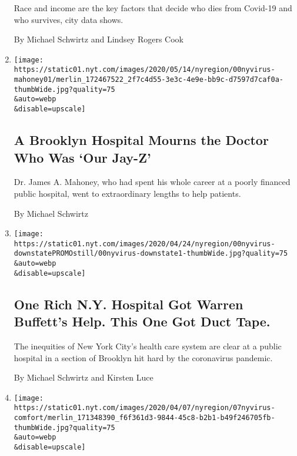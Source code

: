 \begin{enumerate}
  Race and income are the key factors that decide who dies from Covid-19
  and who survives, city data shows.

  By Michael Schwirtz and Lindsey Rogers Cook
\item
  \href{/2020/05/18/nyregion/doctor-dies-coronavirus-james-mahoney.html}{}

  \texttt{[image: https://static01.nyt.com/images/2020/05/14/nyregion/00nyvirus-mahoney01/merlin\_172467522\_2f7c4d55-3e3c-4e9e-bb9c-d7597d7caf0a-thumbWide.jpg?quality=75\\\&auto=webp\\\&disable=upscale]}

  \hypertarget{a-brooklyn-hospital-mourns-the-doctor-who-was-our-jay-z}{%
  \subsection{A Brooklyn Hospital Mourns the Doctor Who Was `Our
  Jay-Z'}\label{a-brooklyn-hospital-mourns-the-doctor-who-was-our-jay-z}}

  Dr. James A. Mahoney, who had spent his whole career at a poorly
  financed public hospital, went to extraordinary lengths to help
  patients.

  By Michael Schwirtz
\item
  \href{/2020/04/26/nyregion/coronavirus-new-york-university-hospital.html}{}

  \texttt{[image: https://static01.nyt.com/images/2020/04/24/nyregion/00nyvirus-downstatePROMOstill/00nyvirus-downstate1-thumbWide.jpg?quality=75\\\&auto=webp\\\&disable=upscale]}

  \hypertarget{one-rich-ny-hospital-got-warren-buffetts-help-this-one-got-duct-tape}{%
  \subsection{One Rich N.Y. Hospital Got Warren Buffett's Help. This One
  Got Duct
  Tape.}\label{one-rich-ny-hospital-got-warren-buffetts-help-this-one-got-duct-tape}}

  The inequities of New York City's health care system are clear at a
  public hospital in a section of Brooklyn hit hard by the coronavirus
  pandemic.

  By Michael Schwirtz and Kirsten Luce
\item
  \href{/2020/04/07/nyregion/usns-comfort-crew-coronavirus.html}{}

  \texttt{[image: https://static01.nyt.com/images/2020/04/07/nyregion/07nyvirus-comfort/merlin\_171348390\_f6f361d3-9844-45c8-b2b1-b49f246705fb-thumbWide.jpg?quality=75\\\&auto=webp\\\&disable=upscale]}


\end{enumerate}
